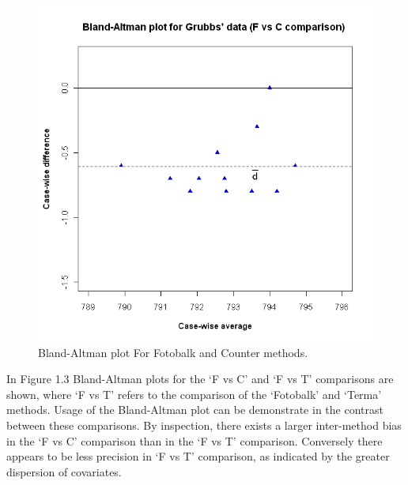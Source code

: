 \documentclass[12pt, a4paper]{report}
\theoremstyle{plain}
\theoremstyle{definition}
\theoremstyle{remark}
\begin{document}
	\newpage
	
	\begin{figure}[h!]
		\begin{center}
			\includegraphics[width=120mm]{images/GrubbsBAplot-noLOA.jpeg}
			\caption{Bland-Altman plot For Fotobalk and Counter methods.}\label{GrubbsBA-noLOA}
		\end{center}
	\end{figure}
	
	
	
	In Figure 1.3 Bland-Altman plots for the `F vs C' and `F vs T'
	comparisons are shown, where `F vs T' refers to the comparison of
	the `Fotobalk' and `Terma' methods. Usage of the Bland-Altman plot
	can be demonstrate in the contrast between these comparisons. By inspection, there exists a larger inter-method bias in the `F vs C' comparison than in the `F vs T' comparison. Conversely there
	appears to be less precision in `F vs T' comparison, as indicated
	by the greater dispersion of covariates.
	
\end{document}
